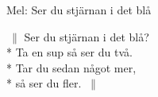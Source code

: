 \begin{SongText}
    \begin{SongInfo}
        Mel: Ser du stjärnan i det blå
    \end{SongInfo}
    \begin{SongVerse}
        $\:\|$ Ser du stjärnan i det blå?\\*%
        Ta en sup så ser du två.\\*%
        Tar du sedan något mer,\\*%
        så ser du fler. $\:\|$
    \end{SongVerse}
\end{SongText}
